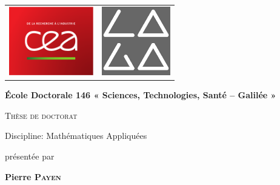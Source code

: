 \hypersetup{pageanchor=false}
\thispagestyle{empty}
\begin{titlepage}
 
\begin{minipage}[t]{\textwidth}
\begin{center}
  \begin{tabularx}{\textwidth}{@{\extracolsep{\fill}}lr}
  \includegraphics[height = 3cm]{images/logo/CEA.pdf} &
  \includegraphics[height = 3cm]{images/logo/laga.jpg}
  \end{tabularx}
\end{center}
\end{minipage}

\begin{center}
{\Large \textbf{École Doctorale 146 « Sciences, Technologies, Santé – Galilée »}}


{\Huge \textsc{Thèse de doctorat}}


{\LARGE Discipline: Mathématiques Appliquées}


{\large présentée par}

{
    \textbf{{\LARGE Pierre \textsc{Payen}}}\\
}


\end{center}
\end{titlepage}
